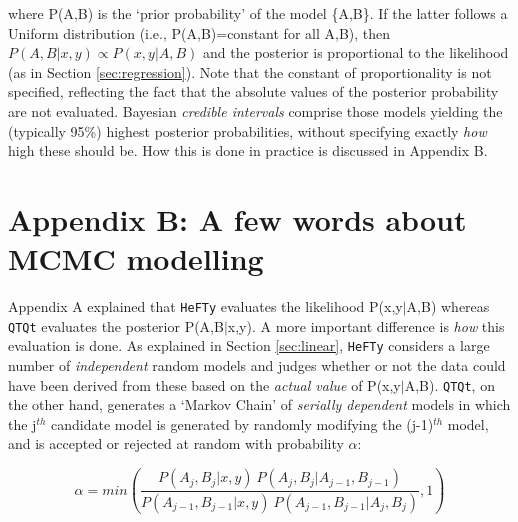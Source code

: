 \documentclass{article}
\begin{document}
where P(A,B) is the `prior probability' of the model \{A,B\}. If the
latter follows a Uniform distribution (i.e., P(A,B)=constant for all
A,B), then $P(A,B|x,y) \propto P(x,y|A,B)$ and the posterior is
proportional to the likelihood (as in Section
\ref{sec:regression}). Note that the constant of proportionality is
not specified, reflecting the fact that the absolute values of the
posterior probability are not evaluated. Bayesian {\it credible
  intervals} comprise those models yielding the (typically 95\%)
highest posterior probabilities, without specifying exactly \emph{how}
high these should be. How this is done in practice is discussed in
Appendix B.

\section*{Appendix B: A few words about MCMC modelling}

Appendix A explained that {\tt HeFTy} evaluates the likelihood
P(x,y$|$A,B) whereas {\tt QTQt} evaluates the posterior P(A,B$|$x,y).
A more important difference is \emph{how} this evaluation is done. As
explained in Section \ref{sec:linear}, {\tt HeFTy} considers a large
number of {\it independent} random models and judges whether or not
the data could have been derived from these based on the {\it actual
  value} of P(x,y$|$A,B). {\tt QTQt}, on the other hand, generates a
`Markov Chain' of {\it serially dependent} models in which the
j$^{th}$ candidate model is generated by randomly modifying the
(j-1)$^{th}$ model, and is accepted or rejected at random with
probability $\alpha$:

\begin{equation}
\alpha = min\left(\frac{P(A_j,B_j|x,y) ~ P(A_j,B_j|A_{j-1},B_{j-1})}
{P(A_{j-1},B_{j-1}|x,y) ~ P(A_{j-1},B_{j-1}|A_{j},B_{j})},1\right)
\label{eq:acceptancecriterion}
\end{equation}
\end{document}
